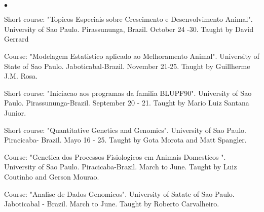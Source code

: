 \documentclass[margin,line,10pt]{res}
\newenvironment{list2}{
  \begin{list}{$\bullet$}{%
      \setlength{\itemsep}{0in}
      \setlength{\parsep}{0in} \setlength{\parskip}{0in}
      \setlength{\topsep}{0in} \setlength{\partopsep}{0in} 
      \setlength{\leftmargin}{0.2in}}}{\end{list}}
\begin{document}
\begin{resume}
\section{}
\begin{list2}
\item Short course: "Topicos Especiais sobre Crescimento e Desenvolvimento Animal". University of Sao Paulo. Pirassununga, Brazil. October 24 -30. Taught by David Gerrard
\vspace{0.5cm}
\item Course: "Modelagem Estatistico aplicado ao Melhoramento Animal". University of State of Sao Paulo. Jaboticabal-Brazil. November 21-25. Taught by Guillherme J.M. Rosa. 
\vspace{0.5cm}
\item Short course: "Iniciacao aos programas da familia BLUPF90". University of Sao Paulo. Pirassununga-Brazil. September 20 - 21. Taught by Mario Luiz Santana Junior.
\vspace{0.5cm}
\item Short course: "Quantitative Genetics and Genomics". University of Sao Paulo. Piracicaba- Brazil. Mayo 16 - 25. Taught by Gota Morota and Matt Spangler.
\vspace{0.5cm}
\item Course: "Genetica dos Processos Fisiologicos em Animais Domesticos ". University of Sao Paulo. Piracicaba-Brazil. March to  June. Taught by Luiz Coutinho and Gerson Mourao.
\vspace{0.5cm}
\item Course: "Analise de Dados Genomicos". University of Satate of Sao Paulo. Jaboticabal - Brazil. March to June. Taught by Roberto Carvalheiro.
\end{list2}  
\vspace{0.5cm}

\section{}


\end{resume}
\end{document}
